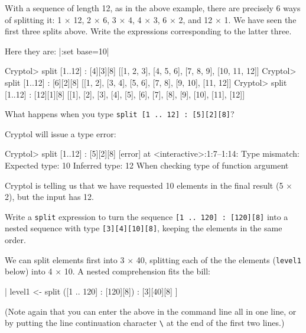 \restartrepl
\begin{Exercise}\label{ex:split:0}
  With a sequence of length 12, as in the above example, there are
  precisely 6 ways of splitting it: 1 $\times$ 12, 2 $\times$ 6, 3
  $\times$ 4, 4 $\times$ 3, 6 $\times$ 2, and 12 $\times$ 1. We have
  seen the first three splits above. Write the expressions
  corresponding to the latter three.\indSplit
\end{Exercise}
\begin{Answer}
  Here they are:\indSplit
\hidereplin|:set base=10|
\begin{replPrompt}
  Cryptol> split [1..12] : [4][3][8]
  [[1, 2, 3], [4, 5, 6], [7, 8, 9], [10, 11, 12]]
  Cryptol> split [1..12] : [6][2][8]
  [[1, 2], [3, 4], [5, 6], [7, 8], [9, 10], [11, 12]]
  Cryptol> split [1..12] : [12][1][8]
  [[1], [2], [3], [4], [5], [6], [7], [8], [9], [10], [11], [12]]
\end{replPrompt}
\end{Answer}

\restartrepl
\begin{Exercise}\label{ex:split:1}
  What happens when you type
  \texttt{split [1 ..\ 12] :\ [5][2][8]}?\indSplit
\end{Exercise}
\begin{Answer}
Cryptol will issue a type error:\indSplit
\begin{replPrompt}
  Cryptol> split [1..12] : [5][2][8]
  [error] at <interactive>:1:7--1:14:
    Type mismatch:
      Expected type: 10
      Inferred type: 12
      When checking type of function argument
\end{replPrompt}
Cryptol is telling us that we have requested 10 elements in the final
result (5 $\times$ 2), but the input has 12.
\end{Answer}

\begin{Exercise}\label{ex:split:2}
  Write a \texttt{split} expression to turn the sequence \texttt{[1 ..\ 120]
    :\ [120][8]} into a nested sequence with type {\tt [3][4][10][8]},
  keeping the elements in the same order.\indSplit {}  \indComp
\end{Exercise}
\begin{Answer}
  We can split elements first into 3 $\times$ 40, splitting each
  of the the elements ({\tt level1} below) into 4 $\times$ 10. A nested
  comprehension fits the bill:\indComp
\restartrepl
\begin{replinVerb}
  [ split level1 : [4][10][8]
  | level1 <- split ([1 .. 120] : [120][8]) : [3][40][8]
  ]
\end{replinVerb}
(Note again that you can enter the above in the command line all in
one line, or by putting the line continuation character
\texttt{\textbackslash} at the end of the first two
lines.)\indLineCont {}
\end{Answer}

